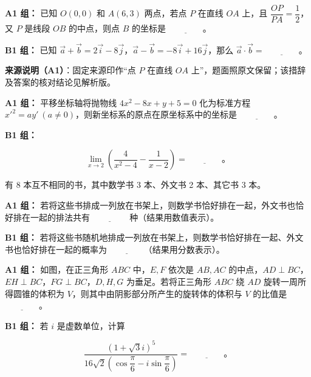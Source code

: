 \begin{question}

\textbf{A1 组：} 已知 $O(0,0)$ 和 $A(6,3)$ 两点，若点 $P$ 在直线 $OA$ 上，且 $\dfrac{OP}{PA}=\dfrac12$，又 $P$ 是线段 $OB$ 的中点，则点 $B$ 的坐标是 $\underline{\qquad\qquad}$。

\textbf{B1 组：} 已知 $\vec a+\vec b=2\vec i-8\vec j$，$\vec a-\vec b=-8\vec i+16\vec j$，那么 $\vec a\cdot\vec b=\underline{\qquad\qquad}$。

\begin{gktip}
\textbf{来源说明（A1）}：固定来源印作“点 $P$ 在直线 $OA$ 上”，题面照原文保留；该措辞及答案的核对结论见解析版。
\end{gktip}

\end{question}
\begin{question}

\textbf{A1 组：} 平移坐标轴将抛物线 $4x^2-8x+y+5=0$ 化为标准方程 $x'^2=ay'\ (a\ne0)$，则新坐标系的原点在原坐标系中的坐标是 $\underline{\qquad\qquad}$。

\textbf{B1 组：}

\nopagebreak[4]
\[
\lim_{x\to2}\left(\dfrac{4}{x^2-4}-\dfrac{1}{x-2}\right)=\underline{\qquad\qquad}\mbox{。}
\]

\end{question}
\begin{question}
有 8 本互不相同的书，其中数学书 3 本、外文书 2 本、其它书 3 本。

\textbf{A1 组：} 若将这些书排成一列放在书架上，则数学书恰好排在一起，外文书也恰好排在一起的排法共有 $\underline{\qquad\qquad}$ 种（结果用数值表示）。

\textbf{B1 组：} 若将这些书随机地排成一列放在书架上，则数学书恰好排在一起、外文书也恰好排在一起的概率为 $\underline{\qquad\qquad}$（结果用分数表示）。

\Needspace{0.4\textheight}
\end{question}
\begin{question}

\textbf{A1 组：} 如图，在正三角形 $ABC$ 中，$E,F$ 依次是 $AB,AC$ 的中点，$AD\perp BC$，$EH\perp BC$，$FG\perp BC$，$D,H,G$ 为垂足。若将正三角形 $ABC$ 绕 $AD$ 旋转一周所得圆锥的体积为 $V$，则其中由阴影部分所产生的旋转体的体积与 $V$ 的比值是 $\underline{\qquad\qquad}$。
\nopagebreak[4]
\begin{center}\end{center}
\nopagebreak[4]
\textbf{B1 组：} 若 $i$ 是虚数单位，计算

\nopagebreak[4]
\[
\dfrac{(1+\sqrt3i)^5}{16\sqrt2\left(\cos\dfrac{\pi}{6}-i\sin\dfrac{\pi}{6}\right)}=\underline{\qquad\qquad}\mbox{。}
\]

\end{question}

